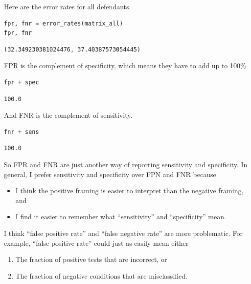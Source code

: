 Here are the error rates for all defendants.

\begin{lstlisting}[language=Python]
fpr, fnr = error_rates(matrix_all)
fpr, fnr
\end{lstlisting}

\begin{lstlisting}[]
(32.349230381024476, 37.40387573054445)
\end{lstlisting}

FPR is the complement of specificity, which means they have to add up to
100\%

\begin{lstlisting}[language=Python]
fpr + spec
\end{lstlisting}

\begin{lstlisting}[]
100.0
\end{lstlisting}

And FNR is the complement of sensitivity.

\begin{lstlisting}[language=Python]
fnr + sens
\end{lstlisting}

\begin{lstlisting}[]
100.0
\end{lstlisting}

So FPR and FNR are just another way of reporting sensitivity and
specificity. In general, I prefer sensitivity and specificity over FPN
and FNR because

\begin{itemize}
\item
  I think the positive framing is easier to interpret than the negative
  framing, and
\item
  I find it easier to remember what ``sensitivity'' and ``specificity''
  mean.
\end{itemize}

I think ``false positive rate'' and ``false negative rate'' are more
problematic. For example, ``false positive rate'' could just as easily
mean either

\begin{enumerate}
\def\labelenumi{\arabic{enumi}.}
\item
  The fraction of positive tests that are incorrect, or
\item
  The fraction of negative conditions that are misclassified.
\end{enumerate}

